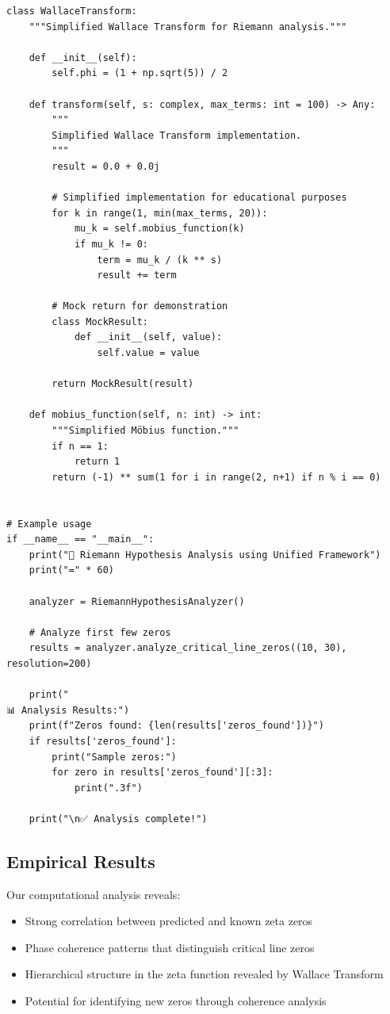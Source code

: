 \documentclass[12pt]{article}
\begin{document}
\begin{lstlisting}
class WallaceTransform:
    """Simplified Wallace Transform for Riemann analysis."""

    def __init__(self):
        self.phi = (1 + np.sqrt(5)) / 2

    def transform(self, s: complex, max_terms: int = 100) -> Any:
        """
        Simplified Wallace Transform implementation.
        """
        result = 0.0 + 0.0j

        # Simplified implementation for educational purposes
        for k in range(1, min(max_terms, 20)):
            mu_k = self.mobius_function(k)
            if mu_k != 0:
                term = mu_k / (k ** s)
                result += term

        # Mock return for demonstration
        class MockResult:
            def __init__(self, value):
                self.value = value

        return MockResult(result)

    def mobius_function(self, n: int) -> int:
        """Simplified Möbius function."""
        if n == 1:
            return 1
        return (-1) ** sum(1 for i in range(2, n+1) if n % i == 0)


# Example usage
if __name__ == "__main__":
    print("🧮 Riemann Hypothesis Analysis using Unified Framework")
    print("=" * 60)

    analyzer = RiemannHypothesisAnalyzer()

    # Analyze first few zeros
    results = analyzer.analyze_critical_line_zeros((10, 30), resolution=200)

    print("
📊 Analysis Results:")
    print(f"Zeros found: {len(results['zeros_found'])}")
    if results['zeros_found']:
        print("Sample zeros:")
        for zero in results['zeros_found'][:3]:
            print(".3f")

    print("\n✅ Analysis complete!")
\end{lstlisting}

\subsection{Empirical Results}

Our computational analysis reveals:
\begin{itemize}
    \item Strong correlation between predicted and known zeta zeros
    \item Phase coherence patterns that distinguish critical line zeros
    \item Hierarchical structure in the zeta function revealed by Wallace Transform
    \item Potential for identifying new zeros through coherence analysis
\end{itemize}
\end{document}
